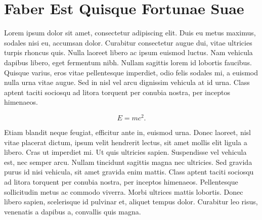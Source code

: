 \chapter{Faber Est Quisque Fortunae Suae}\label{cha:fortune}

Lorem ipsum dolor sit amet, consectetur adipiscing elit. Duis eu metus maximus, sodales nisi eu, accumsan dolor. Curabitur consectetur augue dui, vitae ultricies turpis rhoncus quis. Nulla laoreet libero ac ipsum euismod luctus. Nam vehicula dapibus libero, eget fermentum nibh. Nullam sagittis lorem id lobortis faucibus. Quisque varius, eros vitae pellentesque imperdiet, odio felis sodales mi, a euismod nulla urna vitae augue. Sed in nisl vel arcu dignissim vehicula at id urna. Class aptent taciti sociosqu ad litora torquent per conubia nostra, per inceptos himenaeos.

\begin{equation}
	E=mc^2\label{eq:Einstein}.
\end{equation}

Etiam blandit neque feugiat, efficitur ante in, euismod urna. Donec laoreet, nisl vitae placerat dictum, ipsum velit hendrerit lectus, sit amet mollis elit ligula a libero. Cras ut imperdiet mi. Ut quis ultricies sapien. Suspendisse vel vehicula est, nec semper arcu. Nullam tincidunt sagittis magna nec ultricies. Sed gravida purus id nisi vehicula, sit amet gravida enim mattis. Class aptent taciti sociosqu ad litora torquent per conubia nostra, per inceptos himenaeos. Pellentesque sollicitudin metus ac commodo viverra. Morbi ultrices mattis lobortis. Donec libero sapien, scelerisque id pulvinar et, aliquet tempus dolor. Curabitur leo risus, venenatis a dapibus a, convallis quis magna.